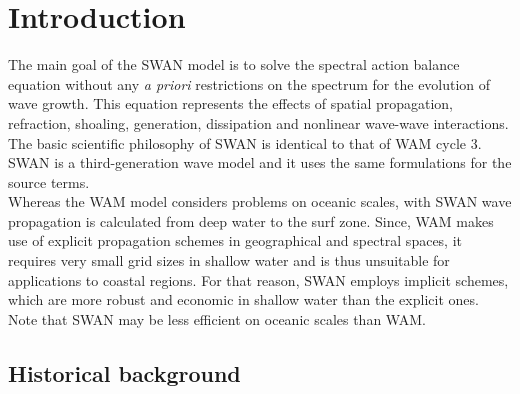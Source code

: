 \documentclass[12pt]{book}
\begin{document}
\clearpage
\pagestyle{myheadings}
\newcommand{\chap}[1] %
       {
        \chapter{#1}
        \markboth{\hfill Chapter \thechapter \hfill}{\hfill {#1} \hfill}
       }

\tableofcontents

\chap{Introduction} \label{ch:intro}

The main goal of the SWAN model is to solve the spectral action balance equation without any {\em a priori}
restrictions on the spectrum for the evolution of wave growth. This equation represents the effects of
spatial propagation, refraction, shoaling, generation, dissipation and nonlinear wave-wave interactions.
The basic scientific philosophy of SWAN is identical to that of WAM cycle 3. SWAN is a third-generation wave
model and it uses the same formulations for the source terms.
\nocite{WAM88}
\\[2ex]
\noindent
Whereas the WAM model considers problems on oceanic scales, with SWAN wave propagation is calculated
from deep water to the surf zone. Since, WAM makes use of explicit propagation schemes in geographical and
spectral spaces, it requires very small grid sizes in shallow water and is thus unsuitable for applications
to coastal regions. For that reason, SWAN employs implicit schemes, which are more robust and economic
in shallow water than the explicit ones. Note that SWAN may be less efficient on oceanic scales than WAM.

\section{Historical background} \label{sec:hist}
\end{document}
